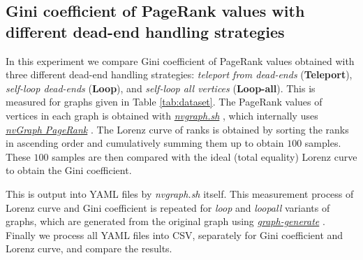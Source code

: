 \subsection{Gini coefficient of PageRank values with different dead-end handling strategies}

In this experiment we compare Gini coefficient of PageRank values obtained with three different dead-end handling strategies: \textit{teleport from dead-ends} (\textbf{Teleport}), \textit{self-loop dead-ends} (\textbf{Loop}), and \textit{self-loop all vertices} (\textbf{Loop-all}). This is measured for graphs given in Table \ref{tab:dataset}. The PageRank values of vertices in each graph is obtained with \href{https://www.npmjs.com/package/nvgraph.sh}{\textit{nvgraph.sh}} \cite{sahu2021nvgraph}, which internally uses \href{https://docs.nvidia.com/cuda/archive/10.0/nvgraph/index.html#nvgraph-pagerank-example}{\textit{nvGraph PageRank}} \cite{nvidia2018nvgraph}. The Lorenz curve of ranks is obtained by sorting the ranks in ascending order and cumulatively summing them up to obtain $100$ samples. These $100$ samples are then compared with the ideal (total equality) Lorenz curve to obtain the Gini coefficient. This is output into YAML files by \textit{nvgraph.sh} itself. This measurement process of Lorenz curve and Gini coefficient is repeated for \textit{loop} and \textit{loopall} variants of graphs, which are generated from the original graph using \href{https://github.com/puzzlef/graph-generate}{\textit{graph-generate}} \cite{sahu2022github}. Finally we process all YAML files into CSV, separately for Gini coefficient and Lorenz curve, and compare the results.


